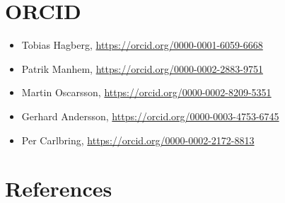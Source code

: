 \documentclass[preprint,
3p]{elsarticle} %
\providecommand{\tightlist}{%
  \setlength{\itemsep}{0pt}\setlength{\parskip}{0pt}}
\begin{document}
\hypertarget{orcid}{%
\section{ORCID}\label{orcid}}

\begin{itemize}
\tightlist
\item
  Tobias Hagberg, \url{https://orcid.org/0000-0001-6059-6668}
\item
  Patrik Manhem, \url{https://orcid.org/0000-0002-2883-9751}
\item
  Martin Oscarsson, \url{https://orcid.org/0000-0002-8209-5351}
\item
  Gerhard Andersson, \url{https://orcid.org/0000-0003-4753-6745}
\item
  Per Carlbring, \url{https://orcid.org/0000-0002-2172-8813}
\end{itemize}

\hypertarget{references}{%
\section{References}\label{references}}

\small
\end{document}
